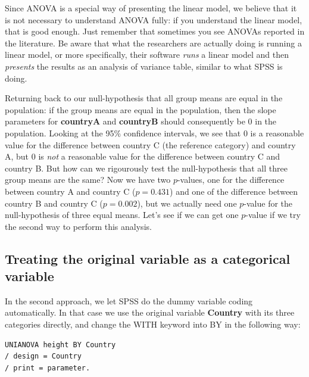 \documentclass[]{book}\usepackage[]{graphicx}\usepackage[]{color}
\begin{document}
Since ANOVA is a special way of presenting the linear model, we believe that it is not necessary to understand ANOVA fully: if you understand the linear model, that is good enough. Just remember that sometimes you see ANOVAs reported in the literature. Be aware that what the researchers are actually doing is running a linear model, or more specifically, their software \textit{runs} a linear model and then \textit{presents} the results as an analysis of variance table, similar to what SPSS is doing.

Returning back to our null-hypothesis that all group means are equal in the population: if the group means are equal in the population, then the slope parameters for \textbf{countryA} and \textbf{countryB} should consequently be 0 in the population. Looking at the 95\% confidence intervals, we see that 0 is a reasonable value for the difference between country C (the reference category) and country A, but 0 is \textit{not} a reasonable value for the difference between country C and country B. But how can we rigourously test the null-hypothesis that all three group means are the same? Now we have two $p$-values, one for the difference between country A and country C ($p=0.431$) and one of the difference between country B and country C ($p=0.002$), but we actually need one $p$-value for the null-hypothesis of three equal means. Let's see if we can get one $p$-value if we try the second way to perform this analysis.




\subsection{Treating the original variable as a categorical variable}

In the second approach, we let SPSS do the dummy variable coding automatically. In that case we use the original variable \textbf{Country} with its three categories directly, and change the WITH keyword into BY in the following way:

\begin{verbatim}
UNIANOVA height BY Country
/ design = Country
/ print = parameter.
\end{verbatim}
\end{document}
